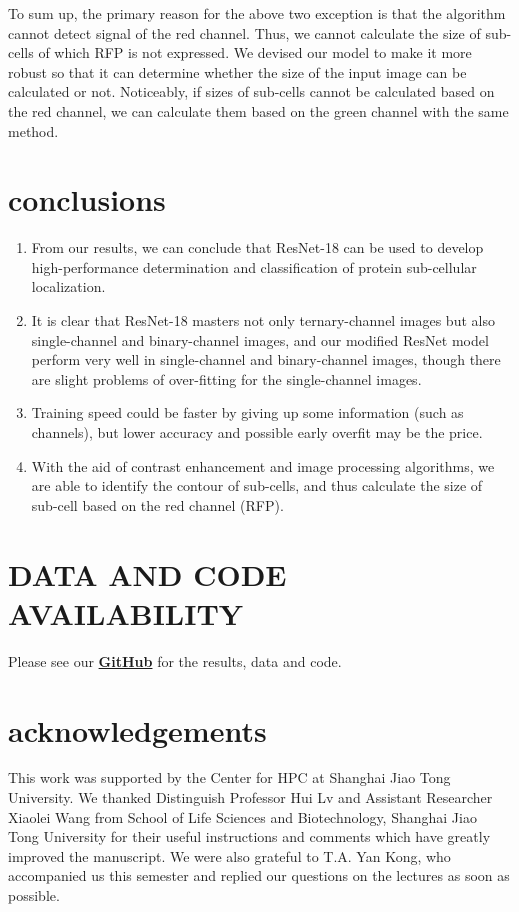 \documentclass[12pt]{article}
\begin{document}
\par To sum up, the primary reason for the above two exception is that the algorithm cannot detect signal of the red channel. Thus, we cannot calculate the size of sub-cells of which RFP is not expressed. We devised our model to make it more robust so that it can determine whether the size of the input image can be calculated or not. Noticeably, if sizes of sub-cells cannot be calculated based on the red channel, we can calculate them based on the green channel with the same method.
\section*{conclusions}
\begin{enumerate}
\item From our results, we can conclude that ResNet-18 can be used to develop high-performance determination and classification of protein sub-cellular localization.
\item It is clear that ResNet-18 masters not only ternary-channel images but also single-channel and binary-channel images, and our modified ResNet model perform very well in single-channel and binary-channel images, though there are slight problems of over-fitting for the single-channel images.
\item Training speed could be faster by giving up some information (such as channels), but lower accuracy and possible early overfit may be the price. 
\item With the aid of contrast enhancement and image processing algorithms, we are able to identify the contour of sub-cells, and thus calculate the size of sub-cell based on the red channel (RFP).
\end{enumerate}
\newpage
\section*{DATA AND CODE AVAILABILITY}
Please see our \href{https://github.com/quyixiang/BioBigData}{\textbf{GitHub}} for the results, data and code.
\section*{acknowledgements}
\par This work was supported by the Center for HPC at Shanghai Jiao Tong University. We thanked Distinguish Professor Hui Lv and Assistant Researcher Xiaolei Wang from School of Life Sciences and Biotechnology, Shanghai Jiao Tong University for their useful instructions and comments which have greatly improved the manuscript. We were also grateful to T.A. Yan Kong, who accompanied us this semester and replied our questions on the lectures as soon as possible. 


\end{document}

